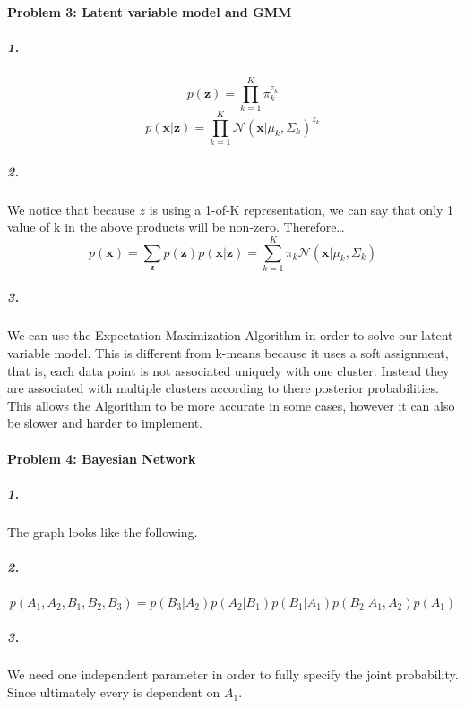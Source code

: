 \documentclass[12pt]{article}
\begin{document}
    \paragraph{Problem 3: Latent variable model and GMM}
    \subparagraph{1.}
    \[
        p(\mathbf{z}) = \prod_{k=1}^{K} \pi_{k}^{z_k}
    \]
    \[
        p(\mathbf{x} | \mathbf{z}) = \prod_{k=1}^{K} \mathcal{N} (\mathbf{x} | \mu_k, \Sigma_k)^{z_k}
    \]
    \subparagraph{2.}
    We notice that because \(z\) is using a 1-of-K representation, we can say that only 1 value of k in the above products will 
    be non-zero. Therefore\dots
    \[
        p(\mathbf{x}) = \sum_{\mathbf{z}} p(\mathbf{z}) p(\mathbf{x} | \mathbf{z}) =
        \sum_{k=1}^{K} \pi_{k} \mathcal{N} (\mathbf{x} | \mu_k, \Sigma_k)
    \]
    \subparagraph{3.}
    We can use the Expectation Maximization Algorithm in order to solve our latent variable model. This is different from k-means because
    it uses a soft assignment, that is, each data point is not associated uniquely with one cluster. Instead they are 
    associated with multiple clusters according to there posterior probabilities. This allows the Algorithm to be more accurate in some cases,
    however it can also be slower and harder to implement.

    \paragraph{Problem 4: Bayesian Network}
    \subparagraph{1.}
    The graph looks like the following.

    \begin{center}
    \end{center}

    \subparagraph{2.}
    \[
        p(A_1, A_2, B_1, B_2, B_3) = p(B_3 | A_2) p(A_2 | B_1) p(B_1 | A_1) p(B_2 | A_1, A_2) p(A_1)
    \]
    \subparagraph{3.}
    We need one independent parameter in order to fully specify the joint probability. Since ultimately every is dependent on \(A_1\).
\end{document}

